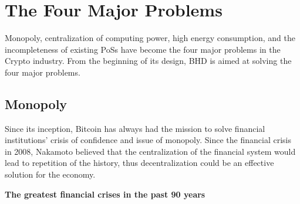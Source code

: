 \chapter{The Four Major Problems}
\begin{flushleft}
    Monopoly, centralization of computing power, high energy consumption, and the incompleteness of existing PoSs have become the four major problems in the Crypto industry. From the beginning of its design, BHD is aimed at solving the four major problems.
\end{flushleft}
\section{Monopoly}
\begin{flushleft}
    Since its inception, Bitcoin has always had the mission to solve financial institutions’ crisis of confidence and issue of monopoly. Since the financial crisis in 2008, Nakamoto believed that the centralization of the financial system would lead to repetition of the history, thus decentralization could be an effective solution for the economy.
\end{flushleft}
\begin{flushleft}
    \centering\textbf{The greatest financial crises in the past 90 years}
\end{flushleft}
